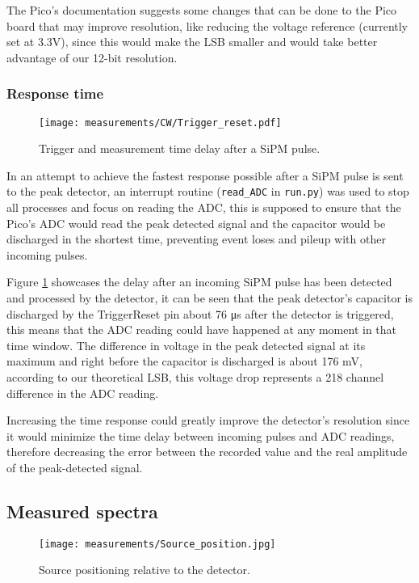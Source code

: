 The Pico's documentation \cite{datasheet2024RpPico} suggests some changes that can be done to the Pico board that may improve resolution, like reducing the voltage reference (currently set at 3.3V), since this would make the LSB smaller and would take better advantage of our 12-bit resolution.

\subsubsection{Response time}

\begin{figure}[H]
  \centering
  \texttt{[image: measurements/CW/Trigger\_reset.pdf]}
  \caption{\label{fig:measurement_speed}Trigger and measurement time delay after a SiPM pulse.}
\end{figure}

In an attempt to achieve the fastest response possible after a SiPM pulse is sent to the peak detector, an interrupt routine (\texttt{read\_ADC} in \texttt{run.py}) was used to stop all processes and focus on reading the ADC, this is supposed to ensure that the Pico's ADC would read the peak detected signal and the capacitor would be discharged in the shortest time, preventing event loses and pileup with other incoming pulses. 

Figure \ref{fig:measurement_speed} showcases the delay after an incoming SiPM pulse has been detected and processed by the detector, it can be seen that the peak detector's capacitor is discharged by the TriggerReset pin about 76 \unit{\micro\s} after the detector is triggered, this means that the ADC reading could have happened at any moment in that time window. The difference in voltage in the peak detected signal at its maximum and right before the capacitor is discharged is about 176 \unit{\mV}, according to our theoretical LSB, this voltage drop represents a 218 channel difference in the ADC reading.

Increasing the time response could greatly improve the detector's resolution since it would minimize the time delay between incoming pulses and ADC readings, therefore decreasing the error between the recorded value and the real amplitude of the peak-detected signal.

\subsection{Measured spectra}

\begin{figure}[H]
  \centering
  \texttt{[image: measurements/Source\_position.jpg]}
  \caption{\label{fig:source_position}Source positioning relative to the detector.}
\end{figure}

